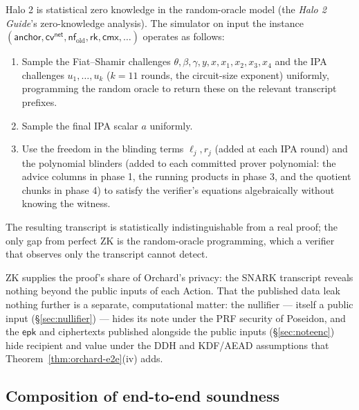 \documentclass[11pt,a4paper]{article}
\theoremstyle{definition}
\newcommand{\nfsym}{\mathsf{nf}}
\newcommand{\cmx}{\mathsf{cmx}}
\newcommand{\cvsym}{\mathsf{cv}}
\newcommand{\rk}{\mathsf{rk}}
\begin{document}
Halo 2 is statistical zero knowledge in the random-oracle model
(the \emph{Halo 2 Guide}'s zero-knowledge analysis). The simulator on input the instance
$(\mathsf{anchor}, \cvsym^{\mathsf{net}}, \nfsym_{\mathrm{old}}, \rk, \cmx, \ldots)$
operates as follows:
\begin{enumerate}[leftmargin=*]
\item Sample the Fiat--Shamir challenges $\theta, \beta, \gamma, y, x, x_1, x_2, x_3, x_4$
and the IPA challenges $u_1, \dots, u_{k}$ ($k = 11$ rounds, the
circuit-size exponent) uniformly, programming the
random oracle to return these on the relevant transcript prefixes.
\item Sample the final IPA scalar $a$ uniformly.
\item Use the freedom in the blinding terms $\ell_j, r_j$ (added at each
IPA round) and the polynomial blinders (added to each committed prover
polynomial: the advice columns in phase 1, the running products in phase 3,
and the quotient chunks in phase 4) to satisfy
the verifier's equations algebraically without knowing the witness.
\end{enumerate}
The resulting transcript is statistically indistinguishable from a real
proof; the only gap from perfect ZK is the random-oracle programming,
which a verifier that observes only the transcript cannot detect.

ZK supplies the proof's share of Orchard's privacy: the SNARK transcript
reveals nothing beyond the public inputs of each Action. That the published
data leak nothing further is a separate, computational matter: the
nullifier --- itself a public input (\S\ref{sec:nullifier}) --- hides its
note under the PRF security of Poseidon, and the $\mathsf{epk}$ and
ciphertexts published alongside the public inputs (\S\ref{sec:noteenc})
hide recipient and value under the DDH and KDF/AEAD assumptions that
Theorem~\ref{thm:orchard-e2e}(iv) adds.

\subsection{Composition of end-to-end soundness}\label{sec:e2e-snd}
\end{document}
